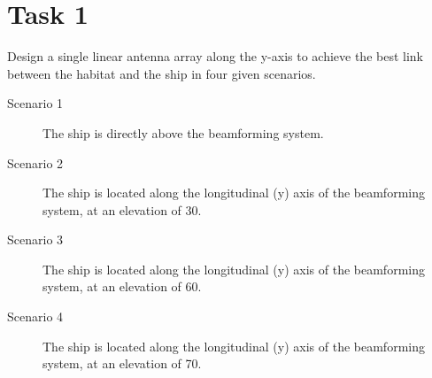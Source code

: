 \documentclass{article}[a4paper]
\begin{document}
\pagebreak

\section*{Task 1}

Design a single linear antenna array along the y-axis to achieve the best link between the habitat and the ship in four given scenarios.
\begin{description}
	\item[Scenario 1] The ship is directly above the beamforming system.
	\item[Scenario 2] The ship is located along the longitudinal (y) axis of the beamforming system, at an elevation of 30\textdegree.
	\item[Scenario 3] The ship is located along the longitudinal (y) axis of the beamforming system, at an elevation of 60\textdegree.
	\item[Scenario 4] The ship is located along the longitudinal (y) axis of the beamforming system, at an elevation of 70\textdegree.
\end{description}
\end{document}
